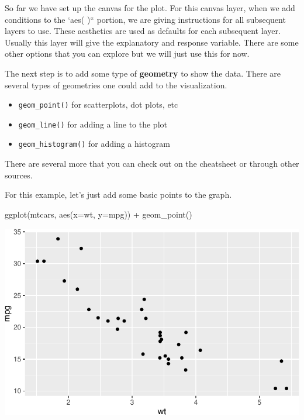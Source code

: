 \documentclass[
  letterpaper,
  DIV=11,
  numbers=noendperiod]{scrreprt}
\newenvironment{Shaded}{\begin{snugshade}}{\end{snugshade}}
\newcommand{\AttributeTok}[1]{\textcolor[rgb]{0.40,0.45,0.13}{#1}}
\newcommand{\FunctionTok}[1]{\textcolor[rgb]{0.28,0.35,0.67}{#1}}
\newcommand{\NormalTok}[1]{\textcolor[rgb]{0.00,0.23,0.31}{#1}}
\newcommand{\SpecialCharTok}[1]{\textcolor[rgb]{0.37,0.37,0.37}{#1}}
\providecommand{\tightlist}{%
  \setlength{\itemsep}{0pt}\setlength{\parskip}{0pt}}\usepackage{longtable,booktabs,array}
\begin{document}
So far we have set up the canvas for the plot. For this canvas layer,
when we add conditions to the `aes( )`` portion, we are giving
instructions for all subsequent layers to use. These aesthetics are used
as defaults for each subsequent layer. Usually this layer will give the
explanatory and response variable. There are some other options that you
can explore but we will just use this for now.

The next step is to add some type of \textbf{geometry} to show the data.
There are several types of geometries one could add to the
visualization.

\begin{itemize}
\tightlist
\item
  \texttt{geom\_point()} for scatterplots, dot plots, etc
\item
  \texttt{geom\_line()} for adding a line to the plot
\item
  \texttt{geom\_histogram()} for adding a histogram
\end{itemize}

There are several more that you can check out on the cheatsheet or
through other sources.

For this example, let's just add some basic points to the graph.

\begin{Shaded}
\begin{Highlighting}[]
\FunctionTok{ggplot}\NormalTok{(mtcars, }\FunctionTok{aes}\NormalTok{(}\AttributeTok{x=}\NormalTok{wt, }\AttributeTok{y=}\NormalTok{mpg)) }\SpecialCharTok{+}
  \FunctionTok{geom\_point}\NormalTok{() }
\end{Highlighting}
\end{Shaded}

\includegraphics{Advanced_Scatterplot_Techniques_files/figure-pdf/unnamed-chunk-3-1.pdf}
\end{document}

